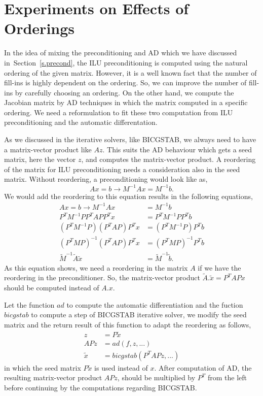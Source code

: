 \documentclass[12pt, oneside]{book}
\newcommand{\secref}[1]{Section~\protect\ref{#1}}
\begin{document}
\section{Experiments on Effects of Orderings}
\label{s.ilu}
In the idea of mixing the preconditioning and AD which
we have discussed in~\secref{s.precond}, the ILU preconditioning is computed
using the natural ordering of the given matrix. However,
it is a well known fact that the number of fill-ins is 
highly dependent on the ordering.
So, we can improve the number of fill-ins by carefully choosing an ordering.
On the other hand, we compute the Jacobian matrix by AD techniques in which
the matrix computed in a specific ordering. We need a reformulation to
fit these two computation from ILU preconditioning and the automatic differentation.

As we discussed in the iterative solvers, like BICGSTAB,
we always need to have a matrix-vector product like $Az$.
This suits the AD behaviour which gets a seed matrix, here the vector $z$, and
computes the matrix-vector product. 
A reordering of the matrix for ILU preconditioning
needs a consideration also in the seed matrix.
Without reordering, a preconditioning would look like as,
$$
Ax = b \rightarrow M^{-1} Ax = M^{-1}b.
$$
We would add the reordering to this equation results in the following equations,
\begin{align*} 
Ax = b \rightarrow M^{-1} Ax &= M^{-1}b\\
P^T M^{-1} P P^T A P P^T x &= P^T M^{-1} P P^T b\\
(P^T M^{-1} P) (P^T A P) P^T x &= (P^T M^{-1} P) P^T b\\
(P^T M P)^{-1} (P^T A P) P^T x &= (P^T M P)^{-1} P^T b\\
\tilde{M}^{-1}\tilde{A}\tilde{x} &= \tilde{M}^{-1}\tilde{b}. 
\end{align*}
As this equation shows, we need a reordering in the matrix $A$ if we 
have the reordering in the preconditioner. 
So, the matrix-vector product $\tilde{A}.\tilde{x} = P^T A P x$ 
should be computed instead of $A.x$.

Let the function $ad$ to compute the automatic differentiation
and the fuction $bicgstab$ to compute a step of BICGSTAB iterative solver,
we modify the seed matrix and the return result of this function 
to adapt the reordering as follows,
\begin{align*}
z &= P \tilde{x}\\
APz &= ad(f,z,...)\\
\tilde{x} &= bicgstab(P^T APz,...)
\end{align*} 
in which the seed matrix $P \tilde{x}$ is used instead of $x$.
After computation of AD, the resulting matrix-vector product $APz$, 
should be multiplied by $P^T$ from the left before continuing by the
computations regarding BICGSTAB.
\end{document}
